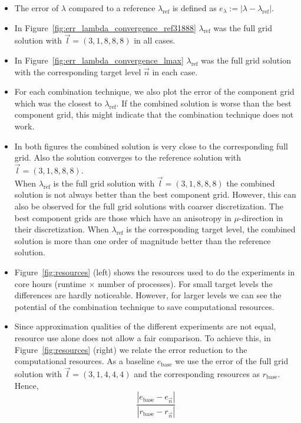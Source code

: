 \documentclass{scrartcl}
\begin{document}
\begin{itemize}
	\item The error of $\lambda$ compared to a reference $\lambda_\text{ref}$ is defined as $e_\lambda := | \lambda - \lambda_\text{ref} |$.
	\item In Figure~\ref{fig:err_lambda_convergence_ref31888} $\lambda_\text{ref}$ was the full grid solution with $\vec{l} = (3,1,8,8,8)$ in all cases.
	\item In Figure~\ref{fig:err_lambda_convergence_lmax} $\lambda_\text{ref}$ was the full grid solution with the corresponding target level $\vec n$ in each case. 
	\item For each combination technique, we also plot the error of the component grid which was the closest to $\lambda_\text{ref}$. If the combined solution is worse than the best component grid, this might indicate that the combination technique does not work.
	\item In both figures the combined solution is very close to the corresponding full grid. Also the solution converges to the reference solution with $\vec{l} = (3,1,8,8,8)$.\\
	When $\lambda_\text{ref}$ is the full grid solution with $\vec{l} = (3,1,8,8,8)$ the combined solution is not always better than the best component grid. However, this can also be observed for the full grid solutions with coarser discretization. The best component grids are those which have an anisotropy in $\mu$-direction in their discretization.
	When $\lambda_\text{ref}$ is the corresponding target level, the combined solution is more than one order of magnitude better than the reference solution.
	\item Figure~\ref{fig:resources} (left) shows the resources used to do the experiments in core hours (runtime $\times$ number of processes).
	For small target levels the differences are hardly noticeable. However, for larger levels we can see the potential of the combination technique to save computational resources.
	\item Since approximation qualities of the different experiments are not equal, resource use alone does not allow a fair comparison. To achieve this, in Figure~\ref{fig:resources} (right) we relate the error reduction to the computational resources. As a baseline $e_{\text{base}}$ we use the error of the full grid solution with $\vec{l} = (3,1,4,4,4)$ and the corresponding resources as $r_{\text{base}}$. Hence,
	\begin{equation}
		\frac{|e_{\text{base}} - e_{\vec{n}}| }{|r_{\text{base}} - r_{\vec n} |}

\end{equation}
\end{itemize}
\end{document}
